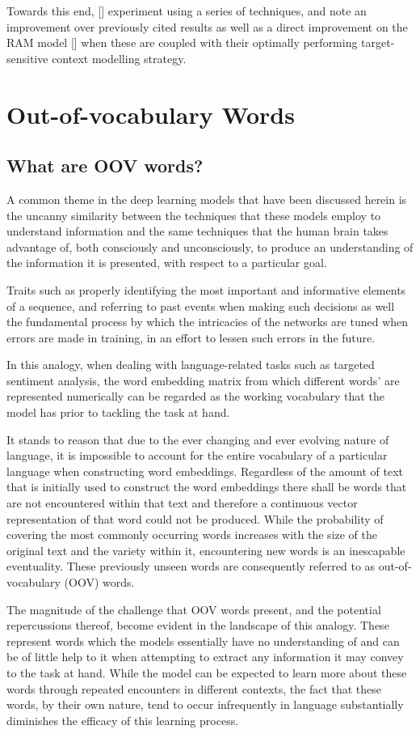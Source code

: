 \documentclass[12pt, a4paper]{report}
\theoremstyle{definition}
\theoremstyle{definition}%
\theoremstyle{definition}%
\theoremstyle{definition}%
\theoremstyle{definition}%
\theoremstyle{definition}%
\renewcommand{\cite}[1]{[\citealp{#1}]}
\begin{document}
Towards this end, \cite{wang2018} experiment using a series of techniques, and note an improvement over previously cited results as well as a direct improvement on the RAM model \cite{chen2017} when these are coupled with their optimally performing target-sensitive context modelling strategy.

\section{Out-of-vocabulary Words}
\subsection{What are OOV words?}
A common theme in the deep learning models that have been discussed herein is the uncanny similarity between the techniques that these models employ to understand information and the same techniques that the human brain takes advantage of, both consciously and unconsciously, to produce an understanding of the information it is presented, with respect to a particular goal. 

Traits such as properly identifying the most important and informative elements of a sequence, and referring to past events when making such decisions as well the fundamental process by which the intricacies of the networks are tuned when errors are made in training, in an effort to lessen such errors in the future. 

In this analogy, when dealing with language-related tasks such as targeted sentiment analysis, the word embedding matrix from which different words' are represented numerically can be regarded as the working vocabulary that the model has prior to tackling the task at hand.

It stands to reason that due to the ever changing and ever evolving nature of language, it is impossible to account for the entire vocabulary of a particular language when constructing word embeddings. Regardless of the amount of text that is initially used to construct the word embeddings there shall be words that are not encountered within that text and therefore a continuous vector representation of that word could not be produced. While the probability of covering the most commonly occurring words increases with the size of the original text and the variety within it, encountering new words is an inescapable eventuality. These previously unseen words are consequently referred to as out-of-vocabulary (OOV) words. 

The magnitude of the challenge that OOV words present, and the potential repercussions thereof, become evident in the landscape of this analogy. These represent words which the models essentially have no understanding of and can be of little help to it when attempting to extract any information it may convey to the task at hand. While the model can be expected to learn more about these words through repeated encounters in different contexts, the fact that these words, by their own nature, tend to occur infrequently in language substantially diminishes the efficacy of this learning process. 
\end{document}
